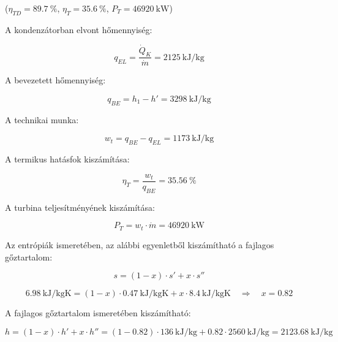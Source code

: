 \noindent ($\eta_{TD} = \SI{89.7}{\percent}$, \quad  $\eta_{T} = \SI{35.6}{\percent}$, \quad $P_{T} = \SI{46920}{\kilo\watt}$)

\noindent\hrulefill

\noindent A kondenzátorban elvont hőmennyiség:

\begin{equation}
	q_{EL} =\dfrac {\dot{Q}_K}{\dot{m}} = \SI{2125}{\kilo\joule\per\kilogram}
\end{equation}

\noindent A bevezetett hőmennyiség:

\begin{equation}
	q_{BE} = h_1 - h'=\SI {3298}{\kilo\joule\per\kilogram}	
\end{equation}

\noindent A technikai munka:

\begin{equation}
	w_t = q_{BE} - q_{EL} =\SI{1173}{\kilo\joule\per\kilogram}
\end{equation}

\noindent A termikus hatásfok kiszámítása:

\begin{equation}
	\eta_{T} = \dfrac {w_t}{q_{BE}} = \SI {35.56}{\percent}
\end{equation}

\noindent A turbina teljesítményének kiszámítása:

\begin{equation}
	P_T = w_t \cdot \dot{m} = \SI{46920}{\kilo\watt}
\end{equation}

\noindent Az entrópiák ismeretében, az alábbi egyenletből kiszámítható a fajlagos gőztartalom:

\begin{equation}
	s = (1-x) \cdot s' + x \cdot s''
\end{equation}

\begin{equation}
	\SI {6.98}{\kilo\joule\per\kilogram\kelvin} = (1-x)\cdot \SI{0.47}{\kilo\joule\per\kilogram\kelvin} + x \cdot \SI{8.4}{\kilo\joule\per\kilogram\kelvin}
	\quad 
	\Rightarrow
	\quad
	x = 0.82
\end{equation}

\noindent A fajlagos gőztartalom ismeretében kiszámítható:

\begin{equation}
	h =  (1-x)\cdot h' + x\cdot h'' = (1-0.82)\cdot \SI{136}{\kilo\joule\per\kilogram} + 0.82 \cdot \SI{2560}{\kilo\joule\per\kilogram} = \SI{2123.68}{\kilo\joule\per\kilogram}	
\end{equation}

